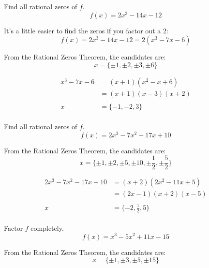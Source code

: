 \documentclass[fleqn,addpoints]{exam}
\begin{document}
\begin{questions}

    \question[10] Find all rational zeros of $f$.
    \[
      f(x) = 2x^3 - 14x - 12
    \]

    \begin{solution}
      It's a little easier to find the zeros if you factor out a 2:
      \[
        f(x) = 2x^3 - 14x - 12 = 2\left( x^3 - 7x - 6 \right)
      \]

      From the Rational Zeros Theorem, the candidates are: 
      \[
        x = \{\pm 1, \pm 2, \pm 3, \pm 6 \}
      \]

      \begin{align*}
        x^3 - 7x - 6 &= (x + 1) (x^2 - x + 6) \\
                     &= (x + 1) (x - 3) (x + 2) \\
                     \\
        x &= \{-1, -2, 3 \} \\
      \end{align*}
    \end{solution}

    \question[10] Find all rational zeros of $f$.
    \[
      f(x) = 2x^3 - 7x^2 - 17x + 10
    \]

    \begin{solution}
      From the Rational Zeros Theorem, the candidates are: 
      \[
        x = \{\pm 1, \pm 2, \pm 5, \pm 10, \pm \frac{1}{2}, \pm \frac{5}{2}  \}
      \]

      \begin{align*}
        2x^3 - 7x^2 - 17x + 10 &= (x + 2) (2x^2 - 11x + 5) \\
                               &= (2x - 1) (x + 2) (x - 5) \\
        \\
        x &= \{-2, \frac{1}{2}, 5 \} \\
      \end{align*}
    \end{solution}

    \question[10] Factor $f$ completely.
    \[
      f(x) = x^3 - 5x^2 + 11x - 15
    \]

    \begin{solution}
      From the Rational Zeros Theorem, the candidates are: 
      \[
        x = \{\pm 1, \pm 3, \pm 5, \pm 15 \}
      \]


\end{solution}
\end{questions}
\end{document}
